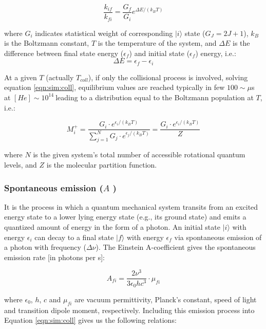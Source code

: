 \begin{equation}
    \frac{k_{if}}{k_{fi}} = \frac{G_f}{G_i} e^{\Delta E / \left(k_B T \right)}
\end{equation}

where $G_i$ indicates statistical weight of corresponding $|i\rangle$ state ($G_J = 2J + 1$), $k_B$ is the Boltzmann constant, $T$ is the temperature of the system, and $\Delta E$ is the difference between final state energy ($\epsilon _f$) and initial state ($\epsilon _f$) energy, i.e.:
\[ \Delta E = \epsilon_f - \epsilon_i \]

At a given $T$ (actually $T_{coll}$), if only the collisional process is involved, solving equation \ref{eqn:sim:coll}, equilibrium values are reached typically in few $100 \sim\mu$s at $[He]\sim 10^{14}\ $\percc leading to a distribution equal to the Boltzmann population at $T$, i.e.:

\begin{equation}
    M^+_i = \frac
        {G_i \cdot e^{\epsilon_i / \left(k_B T \right)}}
        {\sum_{j=1}^{N} G_j \cdot e^{\epsilon_j / \left(k_B T \right)}}
        = \frac{{G_i \cdot e^{\epsilon_i / \left(k_B T \right)}}}{Z}
\end{equation}

where $N$ is the given system's total number of accessible rotational quantum levels, and $Z$ is the molecular partition function.\\ 

\subsubsection{Spontaneous emission (\texorpdfstring{$A$}{A} )}
\label{subsec:ROSAA-simulation-spont}

It is the process in which a quantum mechanical system transits from an excited energy state to a lower lying energy state (e.g., its ground state) and emits a quantized amount of energy in the form of a photon. An initial state $|i\rangle$ with energy $\epsilon_i$ can decay to a final state $|f\rangle$ with energy $\epsilon_f$ via spontaneous emission of a photon with frequency ($\Delta \nu$). The Einstein A-coefficient gives the spontaneous emission rate [in photons per s]:

\[ A_{fi} = \frac{2\nu^3}{3\epsilon _0 h c^3} \cdot \mu _{fi}\]

where $\epsilon _0$, $h$, $c$ and $\mu _{fi}$ are vacuum permittivity, Planck's constant, speed of light and transition dipole moment, respectively. Including this emission process into Equation \ref{eqn:sim:coll} gives us the following relations:

